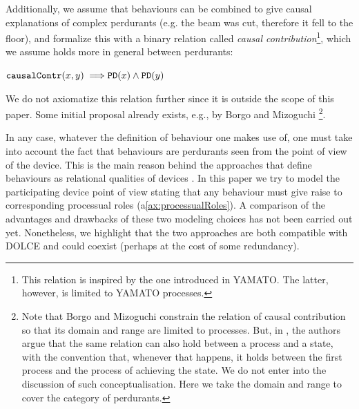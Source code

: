 \documentclass[sw]{iosart2x}
\newcommand{\bflist}{\begin{list}{}{\setlength{\topsep}{2mm}\setlength{\partopsep}{0mm}\setlength{\parsep}{0mm}\setlength{\leftmargin}{9mm}\setlength{\labelwidth}{8mm}}}
\newcommand{\eflist}{\end{list}}
\newcommand{\AxLabel}{\textrm{a}}
\newcounter{cntax}
\newcommand{\myax}[1]{\refstepcounter{cntax}\begin{small}{\bf \AxLabel\thecntax\label{ax:#1}}\end{small}}
\newcommand{\refax}[1]{({\AxLabel}\ref{#1})}
\newcommand{\generalStyle}[1]{\texttt{#1}}
\newcommand{\biRel}[3]{\generalStyle{#1}(#2,#3)}
\newcommand{\uniRel}[2]{\generalStyle{#1}(#2)}
\newcommand{\myfi}{\hspace{0.9mm} \Longrightarrow}
\newcommand{\DOLCE}{\textsc{DOLCE}\xspace} %
\newcommand{\YAMATO}{\textsc{YAMATO}\xspace}
\newcommand{\DOLCEPerdurant}[1]{\uniRel{{PD}}{#1}}
\newcommand{\causallyContr}[2]{\biRel{causalContr}{#1}{#2}}
\newcommand{\firstTimeKeyWord}[1]{\textit{#1}}
\begin{document}
Additionally, we assume that behaviours can be combined to give causal explanations of complex perdurants (e.g. the beam was cut, therefore it fell to the floor), and formalize this with a binary relation called \firstTimeKeyWord{causal contribution}\footnote{This relation is inspired by the one introduced in \YAMATO \cite{mizoguchiYAMATOAnotherMore}. The latter, however, is limited to \YAMATO processes.}, which we assume holds more in general between perdurants:
\bflist
  \item[\myax{contribRange}] $ \causallyContr{x}{y} \myfi \DOLCEPerdurant{x} \land \DOLCEPerdurant{y} $
\eflist

We do not axiomatize this relation further since it is outside the scope of this paper. Some initial proposal already exists, e.g., by Borgo and Mizoguchi \cite{borgoFirstorderFormalizationEvent2014}\footnote{Note that Borgo and Mizoguchi constrain the relation of causal contribution so that its domain and range are limited to processes. But, in \cite{mizoguchiUnifyingDefinitionArtifact2016}, the authors argue that the same relation can also hold between a process and a state, with the convention that, whenever that happens, it holds between the first process and the process of achieving the state.
We do not enter into the discussion of such conceptualisation. Here we take the domain and range to cover the category of perdurants.}.

In any case, whatever the definition of behaviour one makes use of, one must take into account the fact that behaviours are perdurants seen from the point of view of the device. This is the main reason behind the approaches that define behaviours as relational qualities of devices \cite{borgoFormalOntologicalPerspective2009}. In this paper we try to model the participating device point of view stating that any behaviour must give raise to corresponding processual roles \refax{ax:processualRoles}. A comparison of the advantages and drawbacks of these two modeling choices has not been carried out yet. Nonetheless, we highlight that the two approaches are both compatible with \DOLCE and could coexist (perhaps at the cost of some redundancy).
\end{document}
